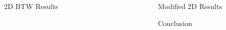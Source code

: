 \documentclass[final]{beamer}
\newlength{\sepwid}
\newlength{\onecolwid}
\begin{document}
\begin{frame}[t]
\begin{columns}[t]
\begin{column}{\onecolwid}
\begin{block}{2D BTW Results}




\end{block}


\end{column} %


\begin{column}{\sepwid}\end{column} %

\begin{column}{\onecolwid} %


\begin{block}{Modified 2D Results}

\end{block}


\begin{block}{Conclusion}



\end{block}




\end{column}
\end{columns}
\end{frame}
\end{document}
